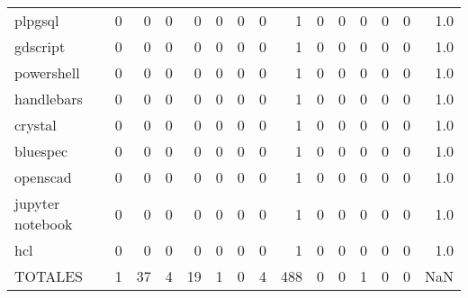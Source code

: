 \begin{tabular}{lrrrrrrrrrrrrrr}
plpgsql          &        0 &       0 &          0 &               0 &                0 &       0 &          0 &          1 &         0 &         0 &      0 &             0 &         0 &      1.0 \\
gdscript         &        0 &       0 &          0 &               0 &                0 &       0 &          0 &          1 &         0 &         0 &      0 &             0 &         0 &      1.0 \\
powershell       &        0 &       0 &          0 &               0 &                0 &       0 &          0 &          1 &         0 &         0 &      0 &             0 &         0 &      1.0 \\
handlebars       &        0 &       0 &          0 &               0 &                0 &       0 &          0 &          1 &         0 &         0 &      0 &             0 &         0 &      1.0 \\
crystal          &        0 &       0 &          0 &               0 &                0 &       0 &          0 &          1 &         0 &         0 &      0 &             0 &         0 &      1.0 \\
bluespec         &        0 &       0 &          0 &               0 &                0 &       0 &          0 &          1 &         0 &         0 &      0 &             0 &         0 &      1.0 \\
openscad         &        0 &       0 &          0 &               0 &                0 &       0 &          0 &          1 &         0 &         0 &      0 &             0 &         0 &      1.0 \\
jupyter notebook &        0 &       0 &          0 &               0 &                0 &       0 &          0 &          1 &         0 &         0 &      0 &             0 &         0 &      1.0 \\
hcl              &        0 &       0 &          0 &               0 &                0 &       0 &          0 &          1 &         0 &         0 &      0 &             0 &         0 &      1.0 \\
TOTALES          &        1 &      37 &          4 &              19 &                1 &       0 &          4 &        488 &         0 &         0 &      1 &             0 &         0 &      NaN \\
\bottomrule
\end{tabular}
